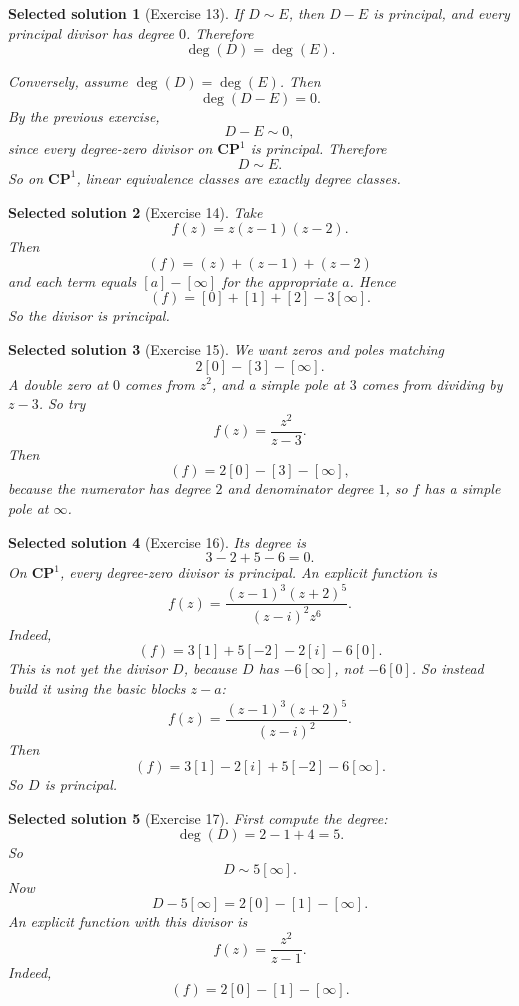 \documentclass[11pt]{article}
\newtheorem*{solution}{Selected solution}
\newcommand{\CP}{\mathbf{CP}^1}
\begin{document}
	\begin{solution}[Exercise 13]
		If \(D\sim E\), then \(D-E\) is principal, and every principal divisor has degree \(0\). Therefore
		\[
		\deg(D)=\deg(E).
		\]
		
		Conversely, assume \(\deg(D)=\deg(E)\). Then
		\[
		\deg(D-E)=0.
		\]
		By the previous exercise,
		\[
		D-E\sim 0,
		\]
		since every degree-zero divisor on \(\CP\) is principal. Therefore
		\[
		D\sim E.
		\]
		So on \(\CP\), linear equivalence classes are exactly degree classes.
	\end{solution}
	
	\begin{solution}[Exercise 14]
		Take
		\[
		f(z)=z(z-1)(z-2).
		\]
		Then
		\[
		(f)=(z)+(z-1)+(z-2)
		\]
		and each term equals \([a]-[\infty]\) for the appropriate \(a\). Hence
		\[
		(f)=[0]+[1]+[2]-3[\infty].
		\]
		So the divisor is principal.
	\end{solution}
	
	\begin{solution}[Exercise 15]
		We want zeros and poles matching
		\[
		2[0]-[3]-[\infty].
		\]
		A double zero at \(0\) comes from \(z^2\), and a simple pole at \(3\) comes from dividing by \(z-3\). So try
		\[
		f(z)=\frac{z^2}{z-3}.
		\]
		Then
		\[
		(f)=2[0]-[3]-[\infty],
		\]
		because the numerator has degree \(2\) and denominator degree \(1\), so \(f\) has a simple pole at \(\infty\).
	\end{solution}
	
	\begin{solution}[Exercise 16]
		Its degree is
		\[
		3-2+5-6=0.
		\]
		On \(\CP\), every degree-zero divisor is principal. An explicit function is
		\[
		f(z)=\frac{(z-1)^3(z+2)^5}{(z-i)^2 z^6}.
		\]
		Indeed,
		\[
		(f)=3[1]+5[-2]-2[i]-6[0].
		\]
		This is not yet the divisor \(D\), because \(D\) has \(-6[\infty]\), not \(-6[0]\). So instead build it using the basic blocks \(z-a\):
		\[
		f(z)=\frac{(z-1)^3(z+2)^5}{(z-i)^2}.
		\]
		Then
		\[
		(f)=3[1]-2[i]+5[-2]-6[\infty].
		\]
		So \(D\) is principal.
	\end{solution}
	
	\begin{solution}[Exercise 17]
		First compute the degree:
		\[
		\deg(D)=2-1+4=5.
		\]
		So
		\[
		D\sim 5[\infty].
		\]
		Now
		\[
		D-5[\infty]=2[0]-[1]-[\infty].
		\]
		An explicit function with this divisor is
		\[
		f(z)=\frac{z^2}{z-1}.
		\]
		Indeed,
		\[
		(f)=2[0]-[1]-[\infty].
		\]
	\end{solution}
	
\end{document}
